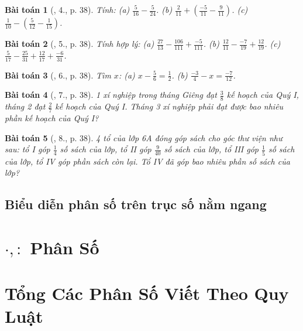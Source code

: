 \documentclass{article}
\newtheorem{baitoan}{Bài toán}
\begin{document}
\begin{baitoan}[\cite{SGK_Toan_6_Canh_Dieu_tap_2}, 4., p. 38]
	Tính: (a) $\frac{5}{16} - \frac{5}{24}$. (b) $\frac{2}{11} + \left(\frac{-5}{11} - \frac{9}{11}\right)$. (c) $\frac{1}{10} - \left(\frac{5}{12} - \frac{1}{15}\right)$.
\end{baitoan}

\begin{baitoan}[\cite{SGK_Toan_6_Canh_Dieu_tap_2}, 5., p. 38]
	Tính hợp lý: (a) $\frac{27}{13} - \frac{106}{111} + \frac{-5}{111}$. (b) $\frac{12}{11} - \frac{-7}{19} + \frac{12}{19}$. (c) $\frac{5}{17} - \frac{25}{31} + \frac{12}{17} + \frac{-6}{31}$.
\end{baitoan}

\begin{baitoan}[\cite{SGK_Toan_6_Canh_Dieu_tap_2}, 6., p. 38]
	Tìm $x$: (a) $x - \frac{5}{6} = \frac{1}{2}$. (b) $\frac{-3}{4} - x = \frac{-7}{12}$.
\end{baitoan}

\begin{baitoan}[\cite{SGK_Toan_6_Canh_Dieu_tap_2}, 7., p. 38]
	1 xí nghiệp trong tháng Giêng đạt $\frac{3}{8}$ kế hoạch của Quý I, tháng 2 đạt $\frac{2}{7}$ kế hoạch của Quý I. Tháng 3 xí nghiệp phải đạt được bao nhiêu phần kế hoạch của Quý I?
\end{baitoan}

\begin{baitoan}[\cite{SGK_Toan_6_Canh_Dieu_tap_2}, 8., p. 38]
	4 tổ của lớp 6A đóng góp sách cho góc thư viện như sau: tổ I góp $\frac{1}{4}$ số sách của lớp, tổ II góp $\frac{9}{40}$ số sách của lớp, tổ III góp $\frac{1}{5}$ số sách của lớp, tổ IV góp phần sách còn lại. Tổ IV đã góp bao nhiêu phần số sách của lớp?
\end{baitoan}

\subsection{Biểu diễn phân số trên trục số nằm ngang}


\section{$\cdot,:$ Phân Số}


\section{Tổng Các Phân Số Viết Theo Quy Luật}
\end{document}
